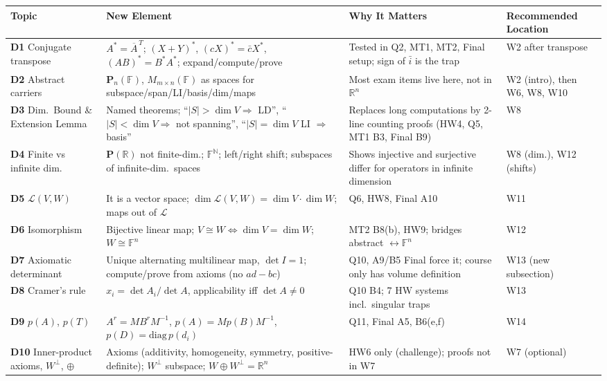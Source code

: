 {\footnotesize
\begin{longtable}{@{}p{2.6cm}p{5.6cm}p{4.6cm}p{3.6cm}@{}}
\toprule \textbf{Topic} & \textbf{New Element} & \textbf{Why It Matters} & \textbf{Recommended Location}\\\midrule\endhead
\textbf{D1} Conjugate transpose & $A^*=\overline{A}^{\,T}$; $(X{+}Y)^*$, $(cX)^*=\bar cX^*$, $(AB)^*=B^*A^*$; expand/compute/prove & Tested in Q2, MT1, MT2, Final setup; sign of $\bar i$ is the trap & W2 after transpose\\
\textbf{D2} Abstract carriers & $\mathbf P_n(\mathbb F)$, $M_{m\times n}(\mathbb F)$ as spaces for subspace/span/LI/basis/dim/maps & Most exam items live here, not in $\mathbb R^n$ & W2 (intro), then W6, W8, W10\\
\textbf{D3} Dim.\ Bound \& Extension Lemma & Named theorems; ``$|S|>\dim V\Rightarrow$ LD'', ``$|S|<\dim V\Rightarrow$ not spanning'', ``$|S|=\dim V$ LI $\Rightarrow$ basis'' & Replaces long computations by 2-line counting proofs (HW4, Q5, MT1 B3, Final B9) & W8\\
\textbf{D4} Finite vs infinite dim. & $\mathbf P(\mathbb R)$ not finite-dim.; $\mathbb F^{\mathbb N}$; left/right shift; subspaces of infinite-dim.\ spaces & Shows injective and surjective differ for operators in infinite dimension & W8 (dim.), W12 (shifts)\\
\textbf{D5} $\mathcal L(V,W)$ & It is a vector space; $\dim\mathcal L(V,W)=\dim V\cdot\dim W$; maps out of $\mathcal L$ & Q6, HW8, Final A10 & W11\\
\textbf{D6} Isomorphism & Bijective linear map; $V\cong W\iff\dim V=\dim W$; $W\cong\mathbb F^n$ & MT2 B8(b), HW9; bridges abstract $\leftrightarrow\mathbb F^n$ & W12\\
\textbf{D7} Axiomatic determinant & Unique alternating multilinear map, $\det I=1$; compute/prove from axioms (no $ad-bc$) & Q10, A9/B5 Final force it; course only has volume definition & W13 (new subsection)\\
\textbf{D8} Cramer's rule & $x_i=\det A_i/\det A$, applicability iff $\det A\ne0$ & Q10 B4; 7 HW systems incl.\ singular traps & W13\\
\textbf{D9} $p(A)$, $p(T)$ & $A^r=MB^rM^{-1}$, $p(A)=Mp(B)M^{-1}$, $p(D)=\mathrm{diag}\,p(d_i)$ & Q11, Final A5, B6(e,f) & W14\\
\textbf{D10} Inner-product axioms, $W^\perp$, $\oplus$ & Axioms (additivity, homogeneity, symmetry, positive-definite); $W^\perp$ subspace; $W\oplus W^\perp=\mathbb R^n$ & HW6 only (challenge); proofs not in W7 & W7 (optional)\\

\end{longtable}}

